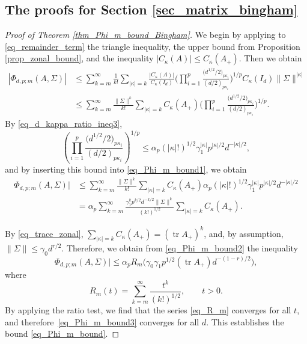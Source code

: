 \documentclass[11pt]{article}
\numberwithin{equation}{section}
\numberwithin{equation}{section}
\def\tr {\mathop{\mathrm{tr}}}
\begin{document}
\subsection[The proofs for Section 2]{The proofs for Section \ref{sec_matrix_bingham}}
\label{sec_proofs_Phi_bounds}

\begin{proof}[Proof of Theorem \ref{thm_Phi_m_bound_Bingham}]
We begin by applying to \eqref{eq_remainder_term} the triangle inequality, the upper bound from Proposition \ref{prop_zonal_bound}, and the inequality $|C_\kappa(A)| \le C_\kappa(A_+)$. Then we obtain
\begin{align}
\label{eq_Phi_m_bound1}
|\Phi_{d,p;m}(A,\Sigma)| &\le \sum_{k=m}^\infty \frac{1}{k!} \sum_{|\kappa|=k} \frac{|C_\kappa(A)|}{C_\kappa(I_d)} \Bigg(\prod_{i=1}^p \frac{\bigl(d^{1/2}/2\bigr)_{p \kappa_i}}{(d/2)_{p \kappa_i}}\Bigg)^{1/p} C_\kappa(I_d) \|\Sigma\|^{|\kappa|} \nonumber \\
&\le \sum_{k=m}^\infty \frac{\|\Sigma\|^k}{k!} \sum_{|\kappa|=k} C_\kappa(A_+) \Bigg(\prod_{i=1}^p \frac{\bigl(d^{1/2}/2\bigr)_{p \kappa_i}}{(d/2)_{p \kappa_i}}\Bigg)^{1/p}.
\end{align}
By \eqref{eq_d_kappa_ratio_ineq3},
\[
\left(\prod_{i=1}^p \frac{\bigl(d^{1/2}/2\bigr)_{p \kappa_i}}{(d/2)_{p \kappa_i}}\right)^{1/p} \le \alpha_p (|\kappa|!)^{1/2} \gamma_1^{|\kappa|} p^{|\kappa|/2} d^{-|\kappa|/2},
\]
and by inserting this bound into \eqref{eq_Phi_m_bound1}, we obtain
\begin{align}
\label{eq_Phi_m_bound2}
\Phi_{d,p;m}(A,\Sigma)| &\le \sum_{k=m}^\infty \frac{\|\Sigma\|^k}{k!} \sum_{|\kappa|=k} C_\kappa(A_+) \alpha_p (|\kappa|!)^{1/2} \gamma_1^{|\kappa|} p^{|\kappa|/2} d^{-|\kappa|/2} \nonumber \\
&= \alpha_p \sum_{k=m}^\infty \frac{\gamma_1^k p^{k/2} d^{-k/2} \|\Sigma\|^k}{(k!)^{1/2}} \sum_{|\kappa|=k} C_\kappa(A_+).
\end{align}

By \eqref{eq_trace_zonal},
$
\sum_{|\kappa|=k} C_\kappa(A_+) = (\tr A_+)^k$,
and, by assumption, $\|\Sigma\| \le \gamma_0 d^{r/2}$. Therefore, we obtain from \eqref{eq_Phi_m_bound2} the inequality
\begin{equation}
\label{eq_Phi_m_bound3}
\Phi_{d,p;m}(A,\Sigma)| \le \alpha_p R_m\bigl(\gamma_0 \gamma_1 p^{1/2} (\tr A_+) d^{-(1-r)/2}\bigr),
\end{equation}
where
\begin{equation}
\label{eq_R_m}
R_m(t) = \sum_{k=m}^\infty \frac{t^k}{(k!)^{1/2}},\qquad t > 0.
\end{equation}
By applying the ratio test, we find that the series \eqref{eq_R_m} converges for all $t$, and therefore~\eqref{eq_Phi_m_bound3} converges for all $d$. This establishes the bound \eqref{eq_Phi_m_bound}.


\end{proof}
\end{document}
